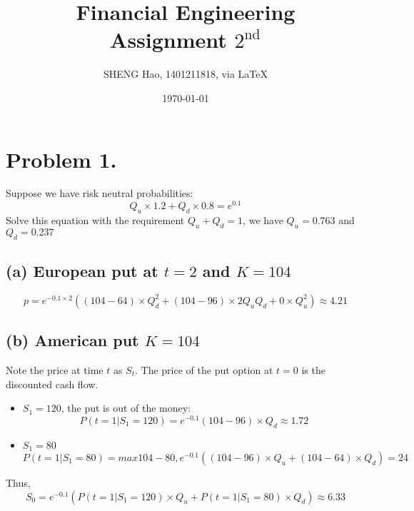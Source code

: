 \documentclass{article}
\begin{document}
\title{Financial Engineering\\Assignment $2^{\text{nd}}$}
\author{{\normalsize SHENG Hao, 1401211818, via \LaTeX}}
\date{\today}

\maketitle

\def \Pr{{\rm Pr}}
\baselineskip 0.6cm


\section{Problem 1.}
Suppose we have risk neutral probabilities:
\begin{equation}
  Q_u \times 1.2 + Q_d \times 0.8 = e^{0.1}
\end{equation}
Solve this equation with the requirement $Q_u + Q_d = 1$, we have $Q_u = 0.763$ and $Q_d = 0.237$

\subsection{(a) European put at $t=2$ and $K=104$}
\begin{equation}
  p = e^{-0.1 \times 2}((104-64)\times {Q_d^2} + (104-96) \times 2 Q_u Q_d + 0 \times Q_u^2) \approx 4.21
\end{equation}
\subsection{(b) American put $K=104$}
  Note the price at time $t$ as $S_t$. The price of the put option at $t=0$ is the discounted cash flow.
  \begin{itemize}
    \item $S_1 = 120$, the put is out of the money:
    \begin{equation}
      P(t=1|S_1=120) = e^{-0.1}(104-96)\times Q_d \approx 1.72
    \end{equation}
    \item $S_1 = 80$
    \begin{equation}
      P(t=1|S_1=80) = max{104-80, e^{-0.1}((104-96)\times Q_u +(104-64)\times Q_d)}=24
    \end{equation}
  \end{itemize}
  Thus, 
  \begin{equation}
    S_0 = e^{-0.1} (P(t=1|S_1=120)\times Q_u + P(t=1|S_1=80) \times Q_d) \approx 6.33
  \end{equation}
\end{document}
